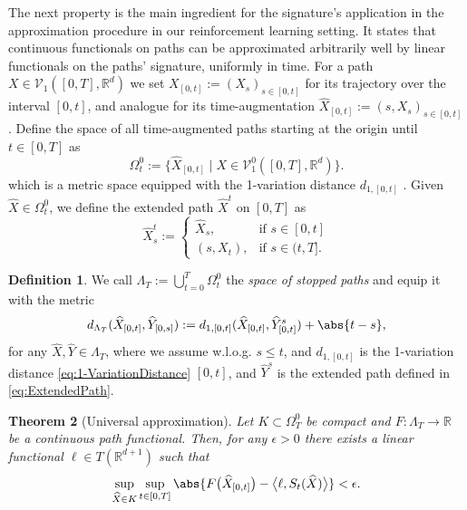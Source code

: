 \documentclass[
    a4paper,
    11pt,
    bibliography=totoc,
    listof=totoc,      
    headinclude=true,
    cleardoublepage=empty,
]{scrbook}
\theoremstyle{plain}
\newtheorem{theorem}{Theorem}[chapter]
\theoremstyle{definition}
\newtheorem{definition}[theorem]{Definition}
\theoremstyle{remark}
\newcommand{\SetR}{\mathbb R}
\begin{document}
The next property is the main ingredient for the signature's application in 
the approximation procedure in our reinforcement learning setting. It states 
that continuous functionals on paths can be approximated arbitrarily well by 
linear functionals on the paths' signature, uniformly in time. For a path 
$X\in\mathcal{V}_1([0,T],\SetR^d)$ we set $X_{[0,t]} := (X_s)_{s\in[0,t]}$ 
for its trajectory over the interval $[0,t]$, and analogue for its 
time-augmentation $\widehat{X}_{[0,t]} := (s,X_s)_{s\in[0,t]}$. Define the 
space of all time-augmented paths starting at the origin until $t\in[0,T]$ as
\[
    \Omega^0_t 
    := \{\widehat{X}_{[0,t]} 
        \mid X \in\mathcal{V}^0_1([0,T],\SetR^d)\}.
\]
which is a metric space equipped with the 1-variation distance $d_{1,[0,t]}$ .
Given $\widehat{X}\in\Omega^0_t$, we define the extended path $\widehat{X}^t$ 
on $[0,T]$ as
\begin{equation}
\label{eq:ExtendedPath}
    \widehat{X}^t_s := \begin{cases}
        \widehat{X}_s, & \text{if } s\in[0,t]\\
        (s, X_t), & \text{if } s\in(t,T].
    \end{cases}    
\end{equation}

\begin{definition}
\label{def:StoppedPathSpace}
    We call $\Lambda_T := \bigcup_{t=0}^T \Omega^0_t$ the \textit{space of 
    stopped paths} and equip it with the metric
    \begin{equation}
    \label{eq:StoppedPathsMetric}
        d_{\Lambda_T}(\widehat{X}_{[0,t]}, \widehat{Y}_{[0,s]}) 
        := d_{1,[0,t]}(\widehat{X}_{[0,t]}, \widehat{Y}^s_{[0,t]}) + \abs{t-s},
    \end{equation}
    for any $\widehat{X}, \widehat{Y} \in \Lambda_T$, where we assume w.l.o.g. 
    $s\leq t$, and $d_{1,[0,t]}$ is the 1-variation distance 
    \eqref{eq:1-VariationDistance} $[0,t]$, and $\widehat{Y}^s$ 
    is the extended path defined in \eqref{eq:ExtendedPath}.
\end{definition}

\begin{theorem}[Universal approximation] 
\label{thm:UniversalApproximation}
    Let $K\subset \Omega^0_T$ be compact and $F:\Lambda_T \to \SetR$ be a
    continuous path functional. Then, for any $\epsilon>0$ there exists a
    linear functional $\ell\in T(\SetR^{d+1})$
    such that
    \begin{equation}
    \label{eq:UniversalNonLinearity}
        \sup_{\widehat X \in K} \sup_{t\in[0,T]} \abs{
            F\bigl(\widehat X_{[0,t]}\bigr) 
            - \bigl\langle \ell, S_t(\widehat{X}) \bigr\rangle
        } < \epsilon.
    \end{equation}
\end{theorem}
\end{document}
